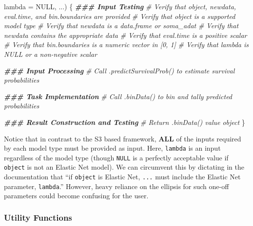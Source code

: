 \documentclass[
]{book}
\newenvironment{Shaded}{\begin{snugshade}}{\end{snugshade}}
\newcommand{\AttributeTok}[1]{\textcolor[rgb]{0.13,0.29,0.53}{#1}}
\newcommand{\CommentTok}[1]{\textcolor[rgb]{0.56,0.35,0.01}{\textit{#1}}}
\newcommand{\ConstantTok}[1]{\textcolor[rgb]{0.56,0.35,0.01}{#1}}
\newcommand{\DocumentationTok}[1]{\textcolor[rgb]{0.56,0.35,0.01}{\textbf{\textit{#1}}}}
\newcommand{\NormalTok}[1]{#1}
\begin{document}
\begin{Shaded}
\begin{Highlighting}[]
                         \AttributeTok{lambda =} \ConstantTok{NULL}\NormalTok{, ...) \{ }
  \DocumentationTok{\#\#\# Input Testing}
  \CommentTok{\# Verify that \textasciigrave{}object\textasciigrave{}, \textasciigrave{}newdata\textasciigrave{}, \textasciigrave{}eval.time\textasciigrave{}, and \textasciigrave{}bin.boundaries\textasciigrave{} are provided}
  \CommentTok{\# Verify that object is a supported model type}
  \CommentTok{\# Verify that \textasciigrave{}newdata\textasciigrave{} is a data.frame or soma\_adat}
  \CommentTok{\# Verify that \textasciigrave{}newdata\textasciigrave{} contains the appropriate data}
  \CommentTok{\# Verify that \textasciigrave{}eval.time\textasciigrave{} is a positive scalar}
  \CommentTok{\# Verify that \textasciigrave{}bin.boundaries\textasciigrave{} is a numeric vector in [0, 1]}
  \CommentTok{\# Verify that \textasciigrave{}lambda\textasciigrave{} is NULL or a non{-}negative scalar}
  
  \DocumentationTok{\#\#\# Input Processing}
  \CommentTok{\# Call \textasciigrave{}.predictSurvivalProb()\textasciigrave{} to estimate survival probabilities}
  
  \DocumentationTok{\#\#\# Task Implementation}
  \CommentTok{\# Call \textasciigrave{}.binData()\textasciigrave{} to bin and tally predicted probabilities}
  
  \DocumentationTok{\#\#\# Result Construction and Testing}
  \CommentTok{\# Return \textasciigrave{}.binData()\textasciigrave{} value object}
\NormalTok{\}}
\end{Highlighting}
\end{Shaded}

Notice that in contrast to the S3 based framework, \textbf{ALL} of the inputs required by each model type must be provided as input. Here, \texttt{lambda} is an input regardless of the model type (though \texttt{NULL} is a perfectly acceptable value if \texttt{object} is not an Elastic Net model). We can circumvent this by dictating in the documentation that ``if \texttt{object} is Elastic Net, \texttt{...} must include the Elastic Net parameter, \texttt{lambda}.'' However, heavy reliance on the ellipsis for such one-off parameters could become confusing for the user.

\hypertarget{utility-functions}{%
\subsubsection{Utility Functions}\label{utility-functions}}
\end{document}
